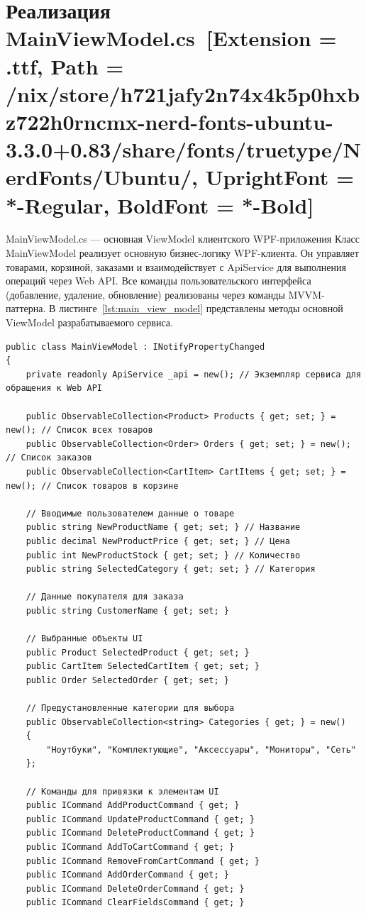 \documentclass[12pt]{article}
\newcommand{\icon}[1]{\fontspec{UbuntuNerdFont}[Extension = .ttf,
  Path = /nix/store/h721jafy2n74x4k5p0hxbz722h0rncmx-nerd-fonts-ubuntu-3.3.0+0.83/share/fonts/truetype/NerdFonts/Ubuntu/,
  UprightFont = *-Regular,
BoldFont = *-Bold] #1}
\newcommand{\iicon}[1]{{\icon{#1}}}
\renewcommand{\texttt}[1]{{\small\ttfamily #1}}
\newenvironment{code}
  {\par\captionsetup{type=listing}\noindent}
  {\par\vspace{\baselineskip}}
\numberwithin{listing}{section}
\numberwithin{figure}{section}
\begin{document}
\section{Реализация \texttt{MainViewModel.cs}~\texorpdfstring{\iicon{}}{}}
\texttt{MainViewModel.cs} — основная ViewModel клиентского WPF-приложения Класс \texttt{MainViewModel} реализует основную бизнес-логику WPF-клиента. Он управляет товарами, корзиной, заказами и взаимодействует с \texttt{ApiService} для выполнения операций через Web API. Все команды пользовательского интерфейса (добавление, удаление, обновление) реализованы через команды MVVM-паттерна. В листинге~\ref{lst:main_view_model} представлены методы основной ViewModel разрабатываемого сервиса.
\begin{code}
	\begin{verbatim}
public class MainViewModel : INotifyPropertyChanged
{
    private readonly ApiService _api = new(); // Экземпляр сервиса для обращения к Web API

    public ObservableCollection<Product> Products { get; set; } = new(); // Список всех товаров
    public ObservableCollection<Order> Orders { get; set; } = new(); // Список заказов
    public ObservableCollection<CartItem> CartItems { get; set; } = new(); // Список товаров в корзине

    // Вводимые пользователем данные о товаре
    public string NewProductName { get; set; } // Название
    public decimal NewProductPrice { get; set; } // Цена
    public int NewProductStock { get; set; } // Количество
    public string SelectedCategory { get; set; } // Категория

    // Данные покупателя для заказа
    public string CustomerName { get; set; }

    // Выбранные объекты UI
    public Product SelectedProduct { get; set; }
    public CartItem SelectedCartItem { get; set; }
    public Order SelectedOrder { get; set; }

    // Предустановленные категории для выбора
    public ObservableCollection<string> Categories { get; } = new()
    {
        "Ноутбуки", "Комплектующие", "Аксессуары", "Мониторы", "Сеть"
    };

    // Команды для привязки к элементам UI
    public ICommand AddProductCommand { get; }
    public ICommand UpdateProductCommand { get; }
    public ICommand DeleteProductCommand { get; }
    public ICommand AddToCartCommand { get; }
    public ICommand RemoveFromCartCommand { get; }
    public ICommand AddOrderCommand { get; }
    public ICommand DeleteOrderCommand { get; }
    public ICommand ClearFieldsCommand { get; }


\end{verbatim}
\end{code}
\end{document}

